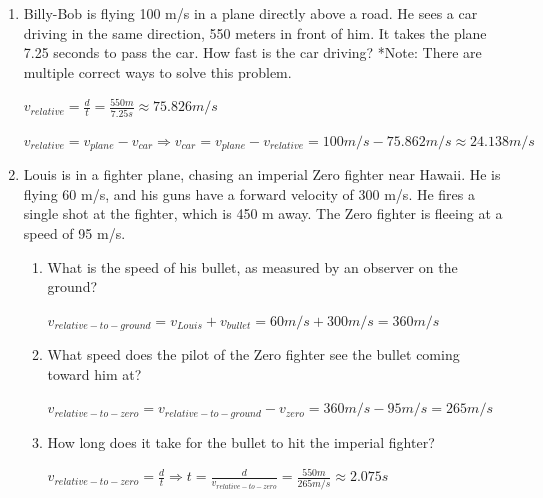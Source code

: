 \documentclass[letterpaper, 12pt]{article}
\begin{document}
\begin{enumerate}
\item Billy-Bob is flying 100 m/s in a plane directly above a road.  He sees a car driving in the same direction, 550 meters in front of him.  It takes the plane 7.25 seconds to pass the car.  How fast is the car driving? \color{red} *Note: There are multiple correct ways to solve this problem.  

\begin{center} $v_{relative}= \frac{d}{t} = \frac{550m}{7.25s} \approx 75.826 m/s $
	
	$ v_{relative} = v_{plane} - v_{car} \Longrightarrow v_{car} = v_{plane} - v_{relative}  = 100m/s - 75.862 m/s \approx 24.138 m/s $
	
\end{center}

\color{black}




\item Louis is in a fighter plane, chasing an imperial Zero fighter near Hawaii.  He is flying 60 m/s, and his guns have a forward velocity of 300 m/s.  He fires a single shot at the fighter, which is 450 m away.  The Zero fighter is fleeing at a speed of 95 m/s.
\begin{enumerate}
	\item What is the speed of his bullet, as measured by an observer on the ground?
	
	\color{red}
	\begin{center} 	$ v_{relative-to-ground} = v_{Louis} + v_{bullet} = 60 m/s + 300 m/s = 360 m/s $
		
	\end{center}
	\vspace {.15in}
	\color{black}
	
	\item What speed does the pilot of the Zero fighter see the bullet coming toward him at?
		\color{red}
			\vspace {.15in}
	\begin{center} 	$ v_{relative-to-zero} = v_{relative-to-ground} - v_{zero} = 360 m/s - 95 m/s = 265 m/s $
		
	\end{center}
	\vspace {.15in}
	\color{black}
	
	
	
	
	\item How long does it take for the bullet to hit the imperial fighter?
		\color{red}
\vspace {.15in}
\begin{center} 	$ v_{relative-to-zero} = \frac{d}{t} \Longrightarrow t =  \frac{d}{v_{relative-to-zero}} = \frac{550m}{265m/s} \approx 2.075s $
	

\end{center}
\end{enumerate}
\end{enumerate}
\end{document}
